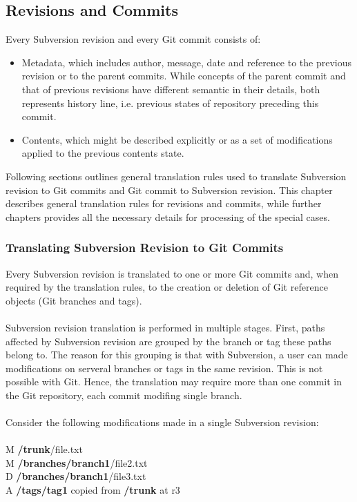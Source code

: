 \subsection{Revisions and Commits}
\label{section_revisions_and_commits}
\renewcommand{\figurename}{Diagram}
Every Subversion revision and every Git commit consists of:
\begin{itemize}
\item Metadata, which includes author, message, date and reference to the previous revision or to the parent commits. While
concepts of the parent commit and that of previous revisions have different semantic in their details, both represents history line, 
i.e. previous states of repository preceding this commit.
\item Contents, which might be described explicitly or as a set of modifications applied to the previous contents state.
\end{itemize}
Following sections outlines general translation rules used to translate Subversion revision to Git commits and Git commit
to Subversion revision. This chapter describes general translation rules for revisions and commits, while further chapters provides all the 
necessary details for processing of the special cases.
\subsubsection{Translating Subversion Revision to Git Commits}
Every Subversion revision is translated to one or more Git commits and,
when required by the translation rules, to the creation or deletion of Git reference objects (Git branches and tags).
\\\\
Subversion revision translation is performed in multiple stages.
First, paths affected by Subversion revision are grouped by the branch or tag these paths belong to. The
reason for this grouping is that with Subversion, a user can made modifications on serveral branches or tags 
in the same revision. This is not possible with Git. Hence, the translation may require more than one commit in the Git repository, 
each commit modifing single branch.
\\\\
Consider the following modifications made in a single Subversion revision:
\\\\
M \textbf{/trunk}/file.txt\\
M \textbf{/branches/branch1}/file2.txt\\
D \textbf{/branches/branch1}/file3.txt\\
A \textbf{/tags/tag1} copied from \textbf{/trunk} at r3\\


